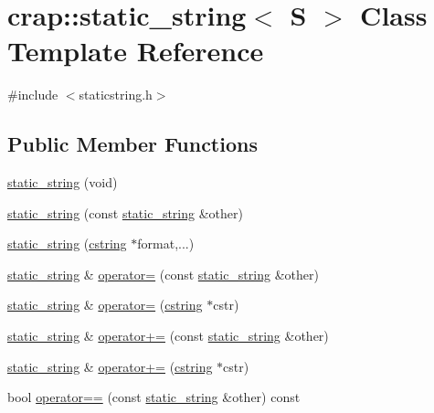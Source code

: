 \hypertarget{classcrap_1_1static__string}{\section{crap\-:\-:static\-\_\-string$<$ S $>$ Class Template Reference}
\label{classcrap_1_1static__string}
}


{\ttfamily \#include $<$staticstring.\-h$>$}

\subsection*{Public Member Functions}
\begin{DoxyCompactItemize}
\item 
\hyperlink{classcrap_1_1static__string_a60906d73d636bfef77ee97f8fe057932}{static\-\_\-string} (void)
\item 
\hyperlink{classcrap_1_1static__string_ad9e5c7edf444016c85a8b7362a16815b}{static\-\_\-string} (const \hyperlink{classcrap_1_1static__string}{static\-\_\-string} \&other)
\item 
\hyperlink{classcrap_1_1static__string_ac8053cc4d317a2983ca1f4202754ed0e}{static\-\_\-string} (\hyperlink{types_8h_a5849681cb91aa8afef6996d9d9e90881}{cstring} $\ast$format,...)
\item 
\hyperlink{classcrap_1_1static__string}{static\-\_\-string} \& \hyperlink{classcrap_1_1static__string_a64b46f58329ad02ab98930ac0bd0da81}{operator=} (const \hyperlink{classcrap_1_1static__string}{static\-\_\-string} \&other)
\item 
\hyperlink{classcrap_1_1static__string}{static\-\_\-string} \& \hyperlink{classcrap_1_1static__string_a121abadd478db86946f2862e08281048}{operator=} (\hyperlink{types_8h_a5849681cb91aa8afef6996d9d9e90881}{cstring} $\ast$cstr)
\item 
\hyperlink{classcrap_1_1static__string}{static\-\_\-string} \& \hyperlink{classcrap_1_1static__string_ac1560d3ca733b576d0db85d2b95005d2}{operator+=} (const \hyperlink{classcrap_1_1static__string}{static\-\_\-string} \&other)
\item 
\hyperlink{classcrap_1_1static__string}{static\-\_\-string} \& \hyperlink{classcrap_1_1static__string_ad70525084df145ba9e9e297bb773edc4}{operator+=} (\hyperlink{types_8h_a5849681cb91aa8afef6996d9d9e90881}{cstring} $\ast$cstr)
\item 
bool \hyperlink{classcrap_1_1static__string_a6ce1a4474db9a8f130a3a0cd9d4e557e}{operator==} (const \hyperlink{classcrap_1_1static__string}{static\-\_\-string} \&other) const 

\end{DoxyCompactItemize}
